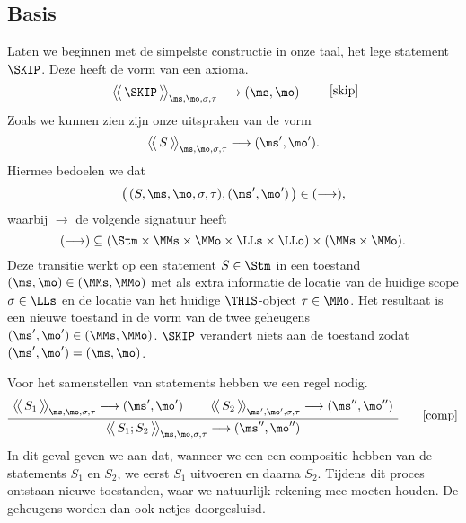 \subsection{Basis}

Laten we beginnen met de simpelste constructie in onze taal, het lege statement $\SKIP$. Deze heeft de vorm van een axioma.
%
\begin{equation*}
  \AxiomC{$
    \Config{\SKIP}{\ms, \mo, \sigma, \tau}
    \longrightarrow
    (\ms, \mo)
  $}
  {\DisplayProof}
  \tag*{[skip]}
\end{equation*}
%
Zoals we kunnen zien zijn onze uitspraken van de vorm
%
\begin{equation*}
  \Config{S}{\ms,\mo,\sigma,\tau} \longrightarrow (\ms',\mo').
\end{equation*}
%
Hiermee bedoelen we dat
%
\begin{equation*}
  \big(\,(S,\ms,\mo,\sigma,\tau), (\ms',\mo')\,\big) \in (\longrightarrow),
\end{equation*}
%
waarbij $\longrightarrow$ de volgende signatuur heeft 
%
\begin{equation*}
  (\longrightarrow) \subseteq (\Stm \times \MMs \times \MMo \times \LLs \times \LLo) \times (\MMs \times \MMo).
\end{equation*}
%
Deze transitie werkt op een statement $S\in\Stm$ in een toestand $(\ms,\mo)\in(\MMs,\MMo)$ met als extra informatie de locatie van de huidige scope $\sigma\in\LLs$ en de locatie van het huidige $\THIS$-object $\tau\in\MMo$. Het resultaat is een nieuwe toestand in de vorm van de twee geheugens $(\ms',\mo')\in(\MMs,\MMo)$. $\SKIP$ verandert niets aan de toestand zodat $(\ms',\mo')=(\ms,\mo)$.

Voor het samenstellen van statements hebben we een regel nodig.
%
\begin{gather*}
  \AxiomC{$
    \Config{S_1}{\ms, \mo, \sigma, \tau}
    \longrightarrow
    (\ms', \mo')
  $}
  \AxiomC{$
    \Config{S_2}{\ms', \mo', \sigma, \tau}
    \longrightarrow
    (\ms'', \mo'')
  $}
  \BinaryInfC{$
    \Config{S_1; S_2}{\ms, \mo, \sigma, \tau}
    \longrightarrow
    (\ms'', \mo'')
  $}
  {\DisplayProof}
  \tag*{[comp]}
\end{gather*}
%
In dit geval geven we aan dat, wanneer we een een compositie hebben van de statements $S_1$ en $S_2$, we eerst $S_1$ uitvoeren%
en daarna $S_2$. Tijdens dit proces ontstaan nieuwe toestanden, waar we natuurlijk rekening mee moeten houden. De geheugens worden dan ook netjes doorgesluisd.

